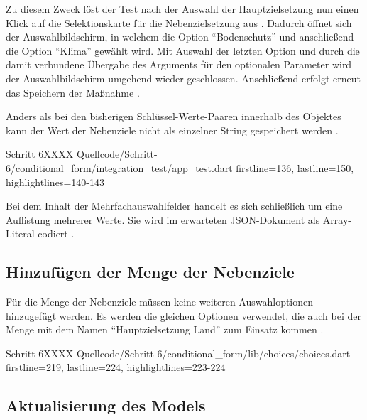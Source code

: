 Zu diesem Zweck löst der Test nach der Auswahl der Hauptzielsetzung  nun einen Klick auf die Selektionskarte für die Nebenzielsetzung aus .
Dadurch öffnet sich der Auswahlbildschirm,
in welchem die Option \enquote{Bodenschutz}  und anschließend die Option \enquote{Klima}  gewählt wird.
Mit Auswahl der letzten Option
und durch die damit verbundene Übergabe des Arguments  für den optionalen Parameter  wird der Auswahlbildschirm umgehend wieder geschlossen.
Anschließend erfolgt erneut das Speichern der Maßnahme .



Anders als bei den bisherigen Schlüssel-Werte-Paaren innerhalb des Objektes  kann der Wert der Nebenziele nicht als einzelner String gespeichert werden \Lst{\ref{lst:Schritt6expectedJson}}.

\begin{alexlisting}{Schritt 6}{XXXX}
  {Quellcode/Schritt-6/conditional_form/integration_test/app_test.dart}
  {firstline=136, lastline=150, highlightlines={140-143}}
  \label{lst:Schritt6expectedJson}
\end{alexlisting}

Bei dem Inhalt der Mehrfachauswahlfelder handelt es sich schließlich um eine Auflistung mehrerer Werte.
Sie wird im erwarteten JSON-Dokument als Array-Literal codiert .



\subsection{Hinzufügen der Menge der Nebenziele}

Für die Menge der Nebenziele müssen keine weiteren Auswahloptionen hinzugefügt werden.
Es werden die gleichen Optionen verwendet,
die auch bei der Menge  mit dem Namen \enquote{Hauptzielsetzung Land} zum Einsatz kommen .

\begin{alexlisting}{Schritt 6}{XXXX}
  {Quellcode/Schritt-6/conditional_form/lib/choices/choices.dart}
  {firstline=219, lastline=224, highlightlines={223-224}}
  \label{lst:Schritt6nebenzielsetzungLandChoices}
\end{alexlisting}

\subsection{Aktualisierung des Models}

